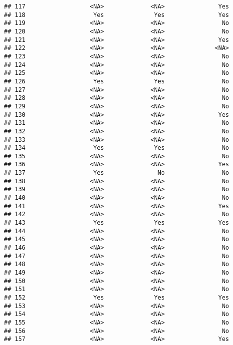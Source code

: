 \documentclass[
]{article}
\begin{document}
\begin{verbatim}
## 117                  <NA>             <NA>               Yes
## 118                   Yes              Yes               Yes
## 119                  <NA>             <NA>                No
## 120                  <NA>             <NA>                No
## 121                  <NA>             <NA>               Yes
## 122                  <NA>             <NA>              <NA>
## 123                  <NA>             <NA>                No
## 124                  <NA>             <NA>                No
## 125                  <NA>             <NA>                No
## 126                   Yes              Yes                No
## 127                  <NA>             <NA>                No
## 128                  <NA>             <NA>                No
## 129                  <NA>             <NA>                No
## 130                  <NA>             <NA>               Yes
## 131                  <NA>             <NA>                No
## 132                  <NA>             <NA>                No
## 133                  <NA>             <NA>                No
## 134                   Yes              Yes                No
## 135                  <NA>             <NA>                No
## 136                  <NA>             <NA>               Yes
## 137                   Yes               No                No
## 138                  <NA>             <NA>                No
## 139                  <NA>             <NA>                No
## 140                  <NA>             <NA>                No
## 141                  <NA>             <NA>               Yes
## 142                  <NA>             <NA>                No
## 143                   Yes              Yes               Yes
## 144                  <NA>             <NA>                No
## 145                  <NA>             <NA>                No
## 146                  <NA>             <NA>                No
## 147                  <NA>             <NA>                No
## 148                  <NA>             <NA>                No
## 149                  <NA>             <NA>                No
## 150                  <NA>             <NA>                No
## 151                  <NA>             <NA>                No
## 152                   Yes              Yes               Yes
## 153                  <NA>             <NA>                No
## 154                  <NA>             <NA>                No
## 155                  <NA>             <NA>                No
## 156                  <NA>             <NA>                No
## 157                  <NA>             <NA>               Yes

\end{verbatim}
\end{document}

